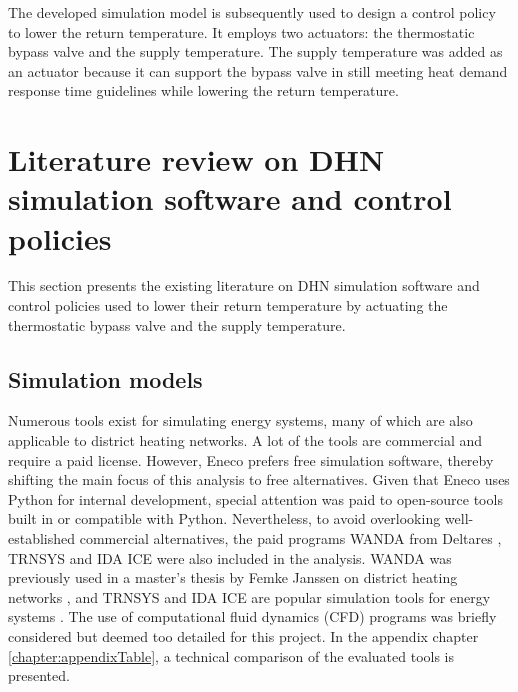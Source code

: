 The developed simulation model is subsequently used to design a control policy to lower the return temperature. It employs two actuators: the thermostatic bypass valve and the supply temperature. The supply temperature was added as an actuator because it can support the bypass valve in still meeting heat demand response time guidelines while lowering the return temperature. 

\section{Literature review on DHN simulation software and control policies}
This section presents the existing literature on DHN simulation software and control policies used to lower their return temperature by actuating the thermostatic bypass valve and the supply temperature.

\subsection{Simulation models}
Numerous tools exist for simulating energy systems, many of which are also applicable to district heating networks. A lot of the tools are commercial and require a paid license. However, Eneco prefers free simulation software, thereby shifting the main focus of this analysis to free alternatives. Given that Eneco uses Python for internal development, special attention was paid to open-source tools built in or compatible with Python. Nevertheless, to avoid overlooking well-established commercial alternatives, the paid programs WANDA from Deltares  \cite{deltaresWanda}, TRNSYS \cite{trnsys1975} and IDA ICE \cite{IDAICe} were also included in the analysis. WANDA was previously used in a master’s thesis by Femke Janssen on district heating networks \cite{FemkeJanssenLit}, and TRNSYS and IDA ICE are popular simulation tools for energy systems \cite{KUNTUAROVA}. The use of computational fluid dynamics (CFD) programs was briefly considered but deemed too detailed for this project. In the appendix chapter \ref{chapter:appendixTable}, a technical comparison of the evaluated tools is presented.  

